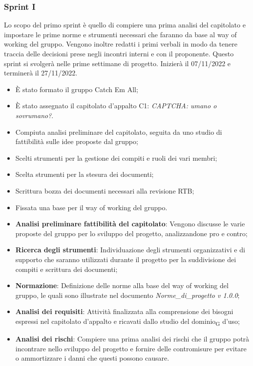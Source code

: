 \subsubsection{Sprint I}
Lo scopo del primo sprint è quello di compiere una prima analisi del capitolato e impostare le prime norme e strumenti necessari che faranno da base al way of working del gruppo. Vengono inoltre redatti i primi verbali in modo da tenere traccia delle decisioni prese negli incontri interni e con il proponente.
Questo sprint si svolgerà nelle prime settimane di progetto. Inizierà il 07/11/2022 e terminerà il 27/11/2022.

\:
\begin{itemize}
	\item È stato formato il gruppo Catch Em All;
	\item È stato assegnato il capitolato d’appalto C1: \textit{CAPTCHA: umano o sovrumano?}.
\end{itemize}

\:
\begin{itemize}
	\item Compiuta analisi preliminare del capitolato, seguita da uno studio di fattibilità sulle idee proposte dal gruppo;
	\item Scelti strumenti per la gestione dei compiti e ruoli dei vari membri;
	\item Scelta strumenti per la stesura dei documenti;
	\item Scrittura bozza dei documenti necessari alla revisione RTB;
	\item Fissata una base per il way of working del gruppo.
\end{itemize}

\:
\begin{itemize}
	\item \textbf{Analisi preliminare fattibilità del capitolato}: Vengono discusse le varie proposte del gruppo per lo sviluppo del progetto, analizzandone pro e contro;
	\item \textbf{Ricerca degli strumenti}: Individuazione degli strumenti organizzativi e di supporto che saranno utilizzati durante il progetto per la suddivisione dei compiti e scrittura dei documenti;
	\item \textbf{Normazione}: Definizione delle norme alla base del way of working del gruppo, le quali sono illustrate nel documento \textit{Norme\_di\_progetto v 1.0.0};
    \item \textbf{Analisi dei requisiti}: Attività finalizzata alla comprensione dei bisogni espressi nel capitolato d’appalto e ricavati dallo studio del dominio\textsubscript{G} d’uso;
    \item \textbf{Analisi dei rischi}: Compiere una prima analisi dei rischi che il gruppo potrà incontrare nello sviluppo del progetto e fornire delle contromisure per evitare o ammortizzare i danni che questi possono causare.
\end{itemize}
\newpage
